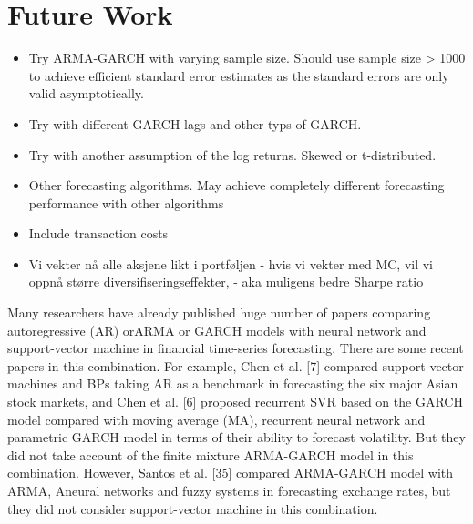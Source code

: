 \chapter{Future Work} \label{FutureWork}

\begin{itemize}
    \item Try ARMA-GARCH with varying sample size. Should use sample size > 1000 to achieve efficient standard error estimates as the standard errors are only valid asymptotically.
    \item Try with different GARCH lags and other typs of GARCH.
    \item Try with another assumption of the log returns. Skewed or t-distributed. 
    \item Other forecasting algorithms. May achieve completely different forecasting performance with other algorithms
    \item Include transaction costs
    \item Vi vekter nå alle aksjene likt i portføljen - hvis vi vekter med MC, vil vi oppnå større diversifiseringseffekter, - aka muligens bedre Sharpe ratio
\end{itemize}

Many researchers have already published huge number of papers comparing autoregressive (AR) orARMA or GARCH models with neural network and support-vector machine in financial time-series forecasting. There are some recent papers in this combination. For example, Chen et al. [7] compared support-vector machines and BPs taking AR as a benchmark in forecasting the six major Asian stock markets, and Chen et al. [6] proposed recurrent SVR based on the GARCH model compared with moving average (MA), recurrent neural network and parametric GARCH model in terms of their ability to forecast volatility. But they did not take account of the finite mixture ARMA-GARCH model in this combination. However, Santos et al. [35] compared ARMA-GARCH model with ARMA, Aneural networks and fuzzy systems in forecasting exchange rates, but they did not consider support-vector machine in this combination. 